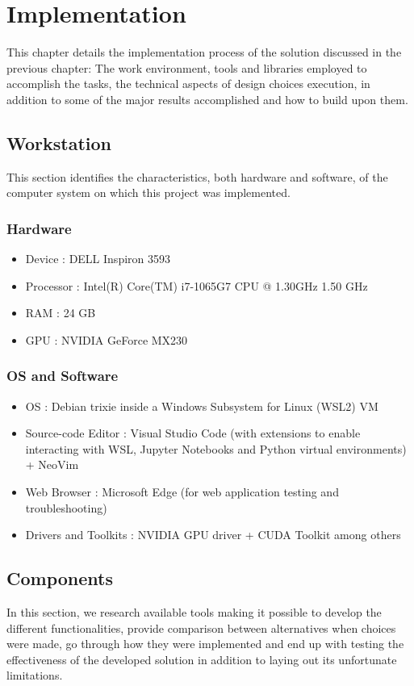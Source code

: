 \chapter{Implementation}
This chapter details the implementation process of the solution discussed in the previous chapter: The work environment, tools and libraries employed to accomplish the tasks, the technical aspects of design choices execution, in addition to some of the major results accomplished and how to build upon them.
\newpage

\section{Workstation}
This section identifies the characteristics, both hardware and software, of the computer system on which this project was implemented.
\bigskip
\subsection{Hardware}
\smallskip
\begin{itemize}
    \item Device : DELL Inspiron 3593
    \item Processor : Intel(R) Core(TM) i7-1065G7 CPU @ 1.30GHz   1.50 GHz
    \item RAM : 24 GB
    \item GPU : NVIDIA GeForce MX230
\end{itemize}
\medskip
\subsection{OS and Software}
\smallskip
\begin{itemize}
    \item OS : Debian trixie inside a Windows Subsystem for Linux (WSL2) VM
    \item Source-code Editor : Visual Studio Code (with extensions to enable interacting with WSL, Jupyter Notebooks and Python virtual environments) + NeoVim
    \item Web Browser : Microsoft Edge (for web application testing and troubleshooting)
    \item Drivers and Toolkits : NVIDIA GPU driver + CUDA Toolkit among others
\end{itemize}
\newpage

\section{Components}
In this section, we research available tools making it possible to develop the different functionalities, provide comparison between alternatives when choices were made, go through how they were implemented and end up with testing the effectiveness of the developed solution in addition to laying out its unfortunate limitations.

